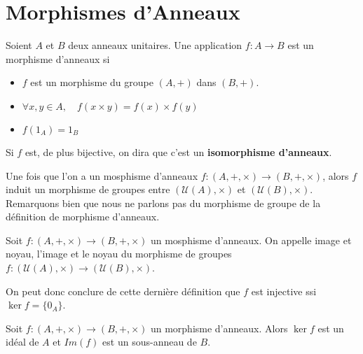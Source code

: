 
\section{Morphismes d'Anneaux} 

\begin{definition}
		Soient $A$ et $B$ deux anneaux unitaires. Une application $f : A \longrightarrow B$ 
		est un morphisme d'anneaux si 
		\begin{itemize} 
				\item $f$ est un morphisme du groupe $(A, +)$ dans $(B, +)$. 
				\item $\forall x, y \in A, \quad f(x \times y) = f(x) \times f(y)$ 
				\item $f(1_A) = 1_B$ 
		\end{itemize} 
		Si $f$ est, de plus bijective, on dira que c'est un \textbf{isomorphisme d'anneaux}. 
\end{definition} 

\begin{proposition} 
		Une fois que l'on a un mosphisme d'anneaux $f : (A, +, \times) \longrightarrow (B, +, \times)$,
		alors $f$ induit un morphisme de groupes entre $ (\mathcal{U}(A), \times)$ et $ (\mathcal{U}(B), \times) $. 
		Remarquons bien que nous ne parlons pas du morphisme de groupe de la définition de morphisme d'anneaux. 
\end{proposition} 

\begin{definition}
		Soit $f : (A, +, \times) \longrightarrow (B, +, \times)$ un mosphisme d'anneaux. 
		On appelle image et noyau, l'image et le noyau du morphisme de groupes $f :  (\mathcal{U}(A), \times) \longrightarrow (\mathcal{U}(B), \times)$. 
\end{definition} 

\begin{remark} 
		On peut donc conclure de cette dernière définition que $f$ est injective ssi $ \ker f = \{0_A\}$.
\end{remark} 

\begin{prop}
		Soit $f : (A,+,\times) \longrightarrow (B,+,\times)$ un morphisme d'anneaux. Alors $ \ker f$ est un idéal de $A$ et 
		$Im (f)$ est un sous-anneau de $B$. 
\end{prop} 

